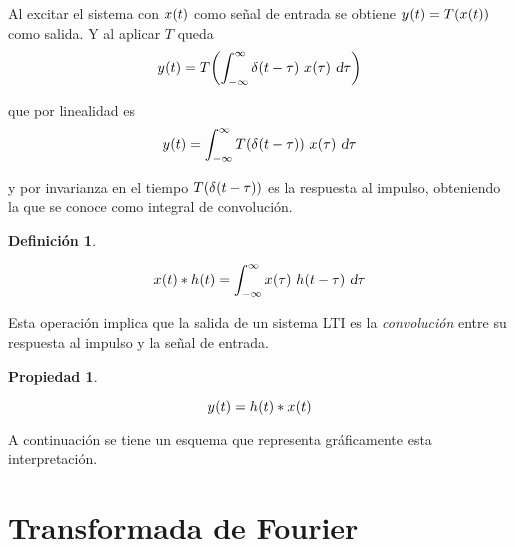 \documentclass[a5paper,12pt,twoside]{book}
\newtheorem{defn}{{Definición}}[chapter]
\newtheorem{prop}{{Propiedad}}[chapter]
\begin{document}
Al excitar el sistema con $\fx[x]{t}$ como señal de entrada se obtiene $\fx[y]{t} = \fx[T]{\fx[x]{t}}$ como salida. Y al aplicar $T$ queda
\begin{equation*}
    \fx[y]{t} = \fx[T]{ \int_{-\infty}^\infty \fx[\delta]{t-\tau} \, \fx[x]{\tau} \, \dif \tau }
\end{equation*}

que por linealidad es
\begin{equation*}
    \fx[y]{t} = \int_{-\infty}^\infty \fx[T]{\fx[\delta]{t-\tau}} \, \fx[x]{\tau} \, \dif \tau
\end{equation*}

y por invarianza en el tiempo $\fx[T]{\fx[\delta]{t-\tau}}$ es la respuesta al impulso, obteniendo la que se conoce como integral de convolución.

\begin{mdframed}[style=MyFrame1]
    \begin{defn}
    \end{defn}
    \begin{equation*}
        \fx[x]{t} * \fx[h]{t} = \int_{-\infty}^\infty \fx[x]{\tau} \, \fx[h]{t-\tau} \, \dif \tau
    \end{equation*}
\end{mdframed}

Esta operación implica que la salida de un sistema LTI es la \emph{convolución} entre su respuesta al impulso y la señal de entrada.

\begin{mdframed}[style=MyFrame1]
    \begin{prop}
    \end{prop}
    \begin{equation*}
        \fx[y]{t} = \fx[h]{t} * \fx[x]{t}
    \end{equation*}
\end{mdframed}

A continuación se tiene un esquema que representa gráficamente esta interpretación.

\begin{center}
    \def\svgwidth{0.8\linewidth}
    
\end{center}


\chapter{Transformada de Fourier}
\end{document}
